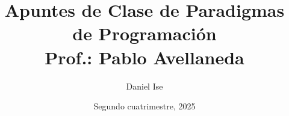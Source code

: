 \documentclass[10pt]{article}
\title{Apuntes de Clase de Paradigmas de Programación\\Prof.: Pablo Avellaneda}
\author{Daniel Ise}
\date{Segundo cuatrimestre, 2025}
\begin{document}
\maketitle
\pagebreak

\tableofcontents
\pagebreak


\end{document}
